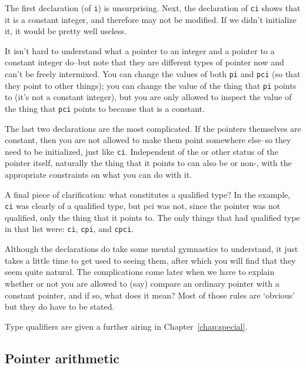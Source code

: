    The first declaration (of \texttt{i}) is unsurprising. Next, the
    declaration of \texttt{ci} shows that it is a constant integer, and
    therefore may not be modified. If we didn't initialize it, it would be
    pretty well useless.


   It isn't hard to understand what a pointer to an integer and a pointer
    to a constant integer do--but note that they are different types of
    pointer now and can't be freely intermixed. You can change the values of
    both \texttt{pi} and \texttt{pci} (so that they point to other
    things); you can change the value of the thing that \texttt{pi}
    points to (it's not a constant integer), but you are only allowed to
    inspect the value of the thing that \texttt{pci} points to because
    that is a constant.


   The last two declarations are the most complicated. If the pointers
    themselves are constant, then you are not allowed to make them point
    somewhere else--so they need to be initialized, just like
    \texttt{ci}. Independent of the \const{} or other status
    of the pointer itself, naturally the thing that it points to can also be
    \const{} or non-\const, with the appropriate
    constraints on what you can do with it.


   A final piece of clarification: what constitutes a qualified type? In
    the example, \texttt{ci} was clearly of a qualified type, but pci
    was not, since the pointer was not qualified, only the thing that it
    points to. The only things that had qualified type in that list were:
    \texttt{ci}, \texttt{cpi}, and \texttt{cpci}.


   Although the declarations do take some mental gymnastics to
    understand, it just takes a little time to get used to seeing them,
    after which you will find that they seem quite natural. The
    complications come later when we have to explain whether or not you are
    allowed to (say) compare an ordinary pointer with a constant pointer,
    and if so, what does it mean? Most of those rules are `obvious'
    but they do have to be stated.


   Type qualifiers are given a further airing in Chapter~\ref{chap:special}.


  

  \subsection{Pointer arithmetic}
   


